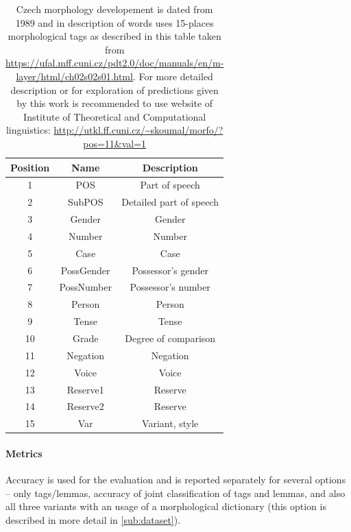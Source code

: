 \begin{table}[!ht]
\centering
\begin{tabular}{ |c|c|c| } 

 \hline
 Position & Name & Description \\ 
 \hline \hline
 1 & POS & Part of speech \\ \hline
 2 & SubPOS & Detailed part of speech \\ \hline
  3 & Gender & Gender \\ \hline
4 & Number & Number \\\hline
  5 & Case & Case \\ \hline
 6 & PossGender & Possessor's gender \\\hline
  7 & PossNumber & Possessor's number \\ \hline
8 & Person & Person \\\hline
  9 & Tense & Tense \\ \hline
 10 & Grade & Degree of comparison\\\hline
  11 & Negation & Negation \\ \hline
 12 & Voice & Voice \\\hline
 13 & Reserve1 & Reserve \\ \hline
14 & Reserve2 & Reserve \\\hline
  15 & Var & Variant, style \\ 
 \hline

\end{tabular}
\caption{Czech morphology developement is dated from 1989 \citep{Hajic2004} 
and in description of words uses 15-places morphological tags as described in this table taken from \url{https://ufal.mff.cuni.cz/pdt2.0/doc/manuals/en/m-layer/html/ch02s02s01.html}. For more detailed  description or for exploration of predictions given by this work is recommended to use website of Institute of Theoretical and Computational linguistics: \url{http://utkl.ff.cuni.cz/~skoumal/morfo/?pos=11\&val=1}}
\label{Tab:tagset}
\end{table}



\paragraph{Metrics} Accuracy is used for the evaluation and is reported separately for several options -- only tags/lemmas, accuracy of joint classification of tags and lemmas, and  also all three variants with an usage of a morphological dictionary (this option is described in more detail in \ref{sub:dataset}).

